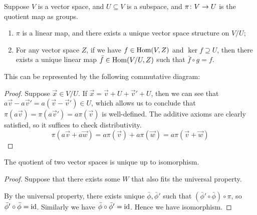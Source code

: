 \begin{proposition}\label{prop:univ-prop-quotient-vsp}
    Suppose \(V\) is a vector space, and \(U \subseteq V\) is a subspace,
    and \(\pi\colon V\to U\) is the quotient map as groups.
    \begin{enumerate}[label={(\roman*)}, itemsep=0mm]
        \item \(\pi\) is a linear map, and there exists a unique vector space structure on \(V/U\);
        \item For any vector space \(Z\), if we have \(f \in \operatorname{Hom}(V,Z)\) and \(\ker f \supseteq U\),
            then there exists a unique linear map \(\bar{f} \in \operatorname{Hom}(V/U,Z)\)
            such that \(\bar{f} \circ g = f\).
    \end{enumerate}

    This can be represented by the following commutative diagram:
    \begin{center}
    \end{center}
\end{proposition}
\begin{proof}
    Suppose \(\vec{x} \in V/U\).
    If \(\vec{x} = \vec{v} + U + \vec{v}' + U\),
    then we can see that \(a\vec{v}-a\vec{v}' = a(\vec{v}-\vec{v}') \in U\),
    which allows us to conclude that \(\pi(a\vec{v}) = \pi(a\vec{v}') = a\pi(\vec{v})\)
    is well-defined.
    The additive axioms are clearly satisfied,
    so it suffices to check distributivity.
    \begin{equation*}
        \pi(a\vec{v}+a\vec{w}) = a\pi(\vec{v}) + a\pi(\vec{w})
        = a\pi(\vec{v} +\vec{w})
    \end{equation*}
\end{proof}
\begin{theorem}
    The quotient of two vector spaces is unique up to isomorphism.
\end{theorem}
\begin{proof}
    Suppose that there exists some \(W\) that also fits the universal property.
    \begin{center}
    \end{center}
    By the universal property, there exists unique \(\bar{\phi},\bar{\phi}'\)
    such that \((\bar{\phi}'\circ\bar{\phi})\circ\pi\),
    so \(\bar{\phi}'\circ\bar{\phi} = \operatorname{id}\).
    Similarly we have \(\bar{\phi}\circ\bar{\phi}' = \operatorname{id}\).
    Hence we have isomorphism.
\end{proof}

